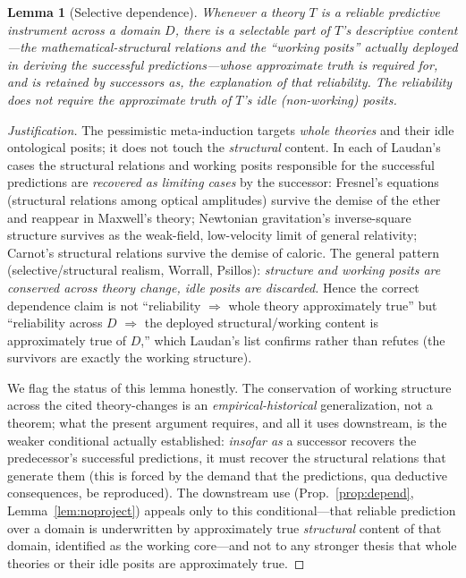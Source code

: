 \documentclass{amsart}
\theoremstyle{definition}
\theoremstyle{plain}
\newtheorem{lemma}{Lemma}
\begin{document}
\begin{lemma}[Selective dependence]\label{lem:selective}
Whenever a theory $T$ is a reliable predictive instrument across a domain
$D$, there is a \emph{selectable} part of $T$'s descriptive content---the
mathematical-structural relations and the ``working posits'' actually deployed
in deriving the successful predictions---whose \emph{approximate truth} is
required for, and is retained by successors as, the explanation of that
reliability. The reliability does not require the approximate truth of $T$'s
\emph{idle} (non-working) posits.
\end{lemma}

\begin{proof}[Justification]
The pessimistic meta-induction targets \emph{whole theories} and their idle
ontological posits; it does not touch the \emph{structural} content. In each of
Laudan's cases the structural relations and working posits responsible for the
successful predictions are \emph{recovered as limiting cases} by the successor:
Fresnel's equations (structural relations among optical amplitudes) survive the
demise of the ether and reappear in Maxwell's theory; Newtonian gravitation's
inverse-square structure survives as the weak-field, low-velocity limit of
general relativity; Carnot's structural relations survive the demise of
caloric. The general pattern (selective/structural realism, Worrall, Psillos):
\emph{structure and working posits are conserved across theory change, idle
posits are discarded.} Hence the correct dependence claim is not ``reliability
$\Rightarrow$ whole theory approximately true'' but ``reliability across $D$
$\Rightarrow$ the deployed structural/working content is approximately true of
$D$,'' which Laudan's list confirms rather than refutes (the survivors are
exactly the working structure).

We flag the status of this lemma honestly. The conservation of working
structure across the cited theory-changes is an \emph{empirical-historical}
generalization, not a theorem; what the present argument requires, and all it
uses downstream, is the weaker conditional actually established: \emph{insofar
as} a successor recovers the predecessor's successful predictions, it must
recover the structural relations that generate them (this is forced by the
demand that the predictions, qua deductive consequences, be reproduced).
The downstream use (Prop.~\ref{prop:depend}, Lemma~\ref{lem:noproject})
appeals only to this conditional---that reliable prediction over a domain is
underwritten by approximately true \emph{structural} content of that domain,
identified as the working core---and not to any stronger thesis that whole
theories or their idle posits are approximately true.
\end{proof}
\end{document}
